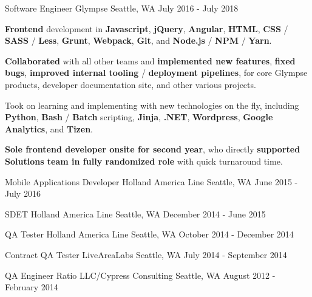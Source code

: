 \begin{cventries}
\cventry
{Software Engineer} %
{Glympse} %
{Seattle, WA} %
{July 2016 - July 2018} %
{
\begin{cvitems}
\item {\textbf{Frontend} development in \textbf{Javascript}, \textbf{jQuery}, \textbf{Angular}, \textbf{HTML}, \textbf{CSS} / \textbf{SASS} / \textbf{Less}, \textbf{Grunt}, \textbf{Webpack}, \textbf{Git}, and \textbf{Node.js} / \textbf{NPM} / \textbf{Yarn}.}
\item {\textbf{Collaborated} with all other teams and \textbf{implemented new features}, \textbf{fixed bugs}, \textbf{improved internal tooling} / \textbf{deployment pipelines}, for core Glympse products, developer documentation site, and other various projects.}
\item {Took on learning and implementing with new technologies on the fly, including \textbf{Python}, \textbf{Bash} / \textbf{Batch} scripting, \textbf{Jinja}, \textbf{.NET}, \textbf{Wordpress}, \textbf{Google Analytics}, and \textbf{Tizen}.}
\item {\textbf{Sole frontend developer onsite for second year}, who directly \textbf{supported Solutions team in fully randomized role} with quick turnaround time.}
\end{cvitems}
}

\cventry
{Mobile Applications Developer} %
{Holland America Line} %
{Seattle, WA} %
{June 2015 - July 2016} %
{}

\cventry
{SDET} %
{Holland America Line} %
{Seattle, WA} %
{December 2014 - June 2015} %
{}

\cventry
{QA Tester} %
{Holland America Line} %
{Seattle, WA} %
{October 2014 - December 2014} %
{}

\cventry
{Contract QA Tester} %
{LiveAreaLabs} %
{Seattle, WA} %
{July 2014 - September 2014} %
{}

\cventry
{QA Engineer} %
{Ratio LLC/Cypress Consulting} %
{Seattle, WA} %
{August 2012 - February 2014} %
{}


\end{cventries}

